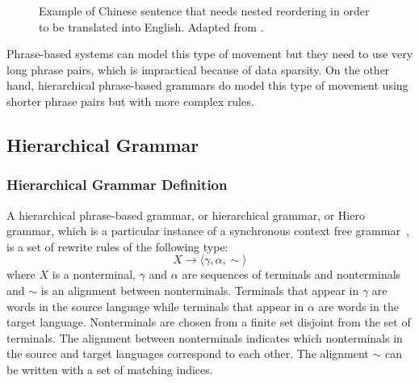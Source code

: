\begin{CJK}{UTF8}{gbsn}
\begin{figure}
\begin{center}
\begin{footnotesize}
    \end{footnotesize}
  \end{center}
  \caption{Example of Chinese sentence that needs nested reordering in order to be translated into English.
  Adapted from \citep{chiang:2007:CL}.}
  \label{fig:exampleHiero}
\end{figure}
\end{CJK}  
%
Phrase-based systems can model this type of movement but
they need to use very long phrase pairs, which is
impractical because of data sparsity. On the other
hand, hierarchical phrase-based grammars do model this type of movement using
shorter phrase pairs but with more complex rules.

\subsection{Hierarchical Grammar}
\label{sec:hiergrammar}

\subsubsection{Hierarchical Grammar Definition}

A hierarchical phrase-based grammar, or hierarchical grammar, or Hiero grammar,
which is a particular instance of a synchronous context free
grammar~\citep{lewis-stearns:1968:JACM,aho:1969:JCSS}, is
a set of rewrite rules of the following type:
%
\begin{equation}
  X \rightarrow \langle \gamma, \alpha, \sim \rangle \nonumber
\end{equation}
%
where $X$ is a nonterminal, $\gamma$ and $\alpha$ are sequences of terminals and nonterminals and $\sim$ is an alignment
between nonterminals. Terminals that appear in $\gamma$ are words in the source language while terminals that appear in $\alpha$ are
words in the target language. Nonterminals are chosen from a finite set disjoint from the set of terminals. The alignment between nonterminals
indicates which nonterminals in the source and target languages correspond to each other. The alignment $\sim$ can be written with 
a set of matching indices.

